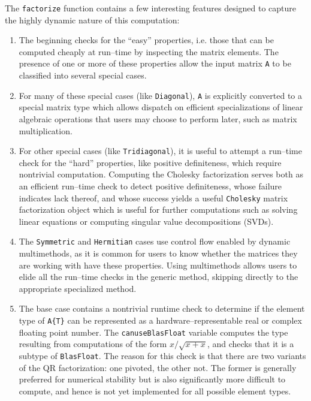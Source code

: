\documentclass[pldi]{sigplanconf-pldi15}
\begin{document}
The \verb|factorize| function contains a few interesting features
designed to capture the highly dynamic nature of this computation:

\begin{enumerate}
\item The beginning checks for the ``easy'' properties, i.e.  those that can be
	computed cheaply at run--time by inspecting the matrix elements. The
	presence of one or more of these properties allow the input matrix
	\verb|A| to be classified into several special cases.

\item For many of these special cases (like \verb|Diagonal|), \verb|A| is
	explicitly converted to a special matrix type which allows dispatch on
	efficient specializations of linear algebraic operations that users may
	choose to perform later, such as matrix multiplication.
	
\item For other special cases (like \verb|Tridiagonal|), it is useful to
	attempt a run--time check for the ``hard'' properties, like positive
	definiteness, which require nontrivial computation. Computing the
	Cholesky factorization serves both as an efficient run--time check to
	detect positive definiteness, whose failure indicates lack thereof, and
	whose success yields a useful \verb|Cholesky| matrix factorization
	object which is useful for further computations such as solving linear
	equations or computing singular value decompositions (SVDs).

\item The \verb|Symmetric| and \verb|Hermitian| cases use control flow
	enabled by dynamic multimethods, as it is common for users to know
	whether the matrices they are working with have these properties.
	Using multimethods allows users to elide all the run--time checks
	in the generic method, skipping directly to the appropriate specialized
	method.

\item The base case contains a nontrivial runtime check to determine if the
	element type of \verb|A{T}| can be represented as a
	hardware--representable real or complex floating point number. The
	\verb|canuseBlasFloat| variable computes the type resulting from
	computations of the form $x / \sqrt{x + x}$, and checks that it is a
	subtype of \verb|BlasFloat|. The reason for this check is that there
	are two variants of the QR factorization: one pivoted, the other not.
	The former is generally preferred for numerical stability but is also
	significantly more difficult to compute, and hence is not yet
	implemented for all possible element types.

\end{enumerate}
\end{document}
